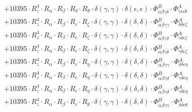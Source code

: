 \documentclass{article}
\begin{document}
\begin{subequations}
\begin{gather}
\begin{array}{c}
 \\[0.2em] 		 + 10395 \cdot R_{z}^{4} \cdot R_{\alpha{}} \cdot R_{\beta{}} \cdot R_{\delta{}} \cdot R_{\theta{}} \cdot \delta{}\left(\gamma{}, \gamma{}\right) \cdot \delta{}\left(\epsilon{}, \epsilon{}\right) \cdot \Phi{}^{B}_{\alpha{}\beta{}\gamma{}\delta{}} \cdot \Phi{}^{A}_{\gamma{}\epsilon{}\epsilon{}\theta{}} 
 \\[0.2em] 		 + 10395 \cdot R_{z}^{4} \cdot R_{\alpha{}} \cdot R_{\beta{}} \cdot R_{\epsilon{}} \cdot R_{\zeta{}} \cdot \delta{}\left(\gamma{}, \gamma{}\right) \cdot \delta{}\left(\delta{}, \delta{}\right) \cdot \Phi{}^{B}_{\alpha{}\beta{}\gamma{}\gamma{}} \cdot \Phi{}^{A}_{\delta{}\delta{}\epsilon{}\zeta{}} 
 \\[0.2em] 		 + 10395 \cdot R_{z}^{4} \cdot R_{\alpha{}} \cdot R_{\beta{}} \cdot R_{\epsilon{}} \cdot R_{\zeta{}} \cdot \delta{}\left(\gamma{}, \gamma{}\right) \cdot \delta{}\left(\delta{}, \delta{}\right) \cdot \Phi{}^{B}_{\alpha{}\beta{}\gamma{}\delta{}} \cdot \Phi{}^{A}_{\gamma{}\delta{}\epsilon{}\zeta{}} 
 \\[0.2em] 		 + 10395 \cdot R_{z}^{4} \cdot R_{\alpha{}} \cdot R_{\beta{}} \cdot R_{\epsilon{}} \cdot R_{\zeta{}} \cdot \delta{}\left(\gamma{}, \gamma{}\right) \cdot \delta{}\left(\delta{}, \delta{}\right) \cdot \Phi{}^{B}_{\alpha{}\beta{}\gamma{}\delta{}} \cdot \Phi{}^{A}_{\gamma{}\delta{}\epsilon{}\zeta{}} 
 \\[0.2em] 		 + 10395 \cdot R_{z}^{4} \cdot R_{\alpha{}} \cdot R_{\beta{}} \cdot R_{\epsilon{}} \cdot R_{\eta{}} \cdot \delta{}\left(\gamma{}, \gamma{}\right) \cdot \delta{}\left(\delta{}, \delta{}\right) \cdot \Phi{}^{B}_{\alpha{}\beta{}\gamma{}\gamma{}} \cdot \Phi{}^{A}_{\delta{}\delta{}\epsilon{}\eta{}} 
 \\[0.2em] 		 + 10395 \cdot R_{z}^{4} \cdot R_{\alpha{}} \cdot R_{\beta{}} \cdot R_{\epsilon{}} \cdot R_{\eta{}} \cdot \delta{}\left(\gamma{}, \gamma{}\right) \cdot \delta{}\left(\delta{}, \delta{}\right) \cdot \Phi{}^{B}_{\alpha{}\beta{}\gamma{}\delta{}} \cdot \Phi{}^{A}_{\gamma{}\delta{}\epsilon{}\eta{}} 
 \\[0.2em] 		 + 10395 \cdot R_{z}^{4} \cdot R_{\alpha{}} \cdot R_{\beta{}} \cdot R_{\epsilon{}} \cdot R_{\eta{}} \cdot \delta{}\left(\gamma{}, \gamma{}\right) \cdot \delta{}\left(\delta{}, \delta{}\right) \cdot \Phi{}^{B}_{\alpha{}\beta{}\gamma{}\delta{}} \cdot \Phi{}^{A}_{\gamma{}\delta{}\epsilon{}\eta{}} 
 \\[0.2em] 		 + 10395 \cdot R_{z}^{4} \cdot R_{\alpha{}} \cdot R_{\beta{}} \cdot R_{\epsilon{}} \cdot R_{\theta{}} \cdot \delta{}\left(\gamma{}, \gamma{}\right) \cdot \delta{}\left(\delta{}, \delta{}\right) \cdot \Phi{}^{B}_{\alpha{}\beta{}\gamma{}\gamma{}} \cdot \Phi{}^{A}_{\delta{}\delta{}\epsilon{}\theta{}} 

\end{array}
\end{gather}
\end{subequations}
\end{document}
